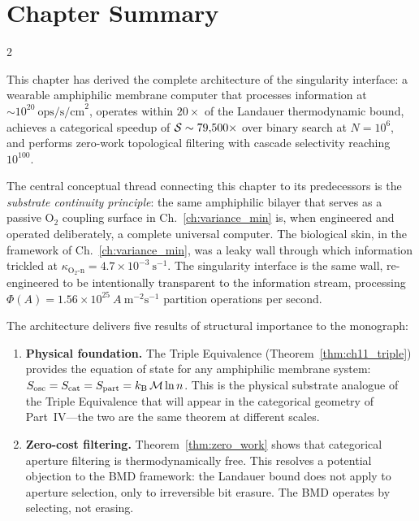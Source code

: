 \section{Chapter Summary}
\label{sec:ch11_summary}

\begin{multicols}{2}

This chapter has derived the complete architecture of the singularity interface: a wearable amphiphilic membrane computer that processes information at $\sim 10^{20}\ \mathrm{ops/s/cm}^2$, operates within $20\times$ of the Landauer thermodynamic bound, achieves a categorical speedup of $\mathcal{S} \sim 79{,}500\times$ over binary search at $N = 10^6$, and performs zero-work topological filtering with cascade selectivity reaching $10^{100}$.

The central conceptual thread connecting this chapter to its predecessors is the \emph{substrate continuity principle}: the same amphiphilic bilayer that serves as a passive O$_2$ coupling surface in Ch.~\ref{ch:variance_min} is, when engineered and operated deliberately, a complete universal computer. The biological skin, in the framework of Ch.~\ref{ch:variance_min}, was a leaky wall through which information trickled at $\kappa_{\mathrm{O_2\text{-}n}} = 4.7 \times 10^{-3}\ \mathrm{s}^{-1}$. The singularity interface is the same wall, re-engineered to be intentionally transparent to the information stream, processing $\Phi(A) = 1.56 \times 10^{25}\ A\ \mathrm{m}^{-2}\mathrm{s}^{-1}$ partition operations per second.

The architecture delivers five results of structural importance to the monograph:

\begin{enumerate}

\item \textbf{Physical foundation.} The Triple Equivalence (Theorem~\ref{thm:ch11_triple}) provides the equation of state for any amphiphilic membrane system: $S_{\mathrm{osc}} = S_{\mathrm{cat}} = S_{\mathrm{part}} = k_{\mathrm{B}}\,\mathcal{M}\ln n$. This is the physical substrate analogue of the Triple Equivalence that will appear in the categorical geometry of Part~IV---the two are the same theorem at different scales.

\item \textbf{Zero-cost filtering.} Theorem~\ref{thm:zero_work} shows that categorical aperture filtering is thermodynamically free. This resolves a potential objection to the BMD framework: the Landauer bound does not apply to aperture selection, only to irreversible bit erasure. The BMD operates by selecting, not erasing.


\end{enumerate}
\end{multicols}
